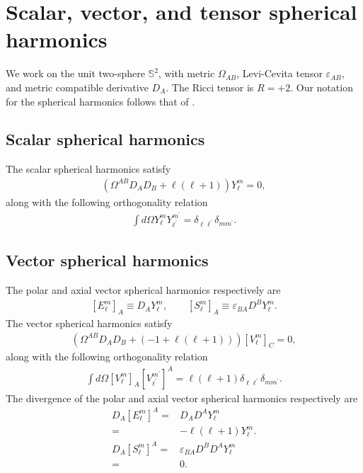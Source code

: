 \documentclass[12pt]{report}
\begin{document}
\appendix
\chapter{Scalar, vector, and tensor spherical harmonics
\label{sec:scalar_vector_tensor_spherical_harmonics}}
We work on the unit two-sphere $\mathbb{S}^2$, with metric $\Omega_{AB}$,
Levi-Cevita tensor $\varepsilon_{AB}$, 
and metric compatible derivative $D_A$. 
The Ricci tensor is $R=+2$.
Our notation for the spherical harmonics follows that of
\cite{Nagar:2005ea}.

\section{Scalar spherical harmonics}
The scalar spherical harmonics satisfy
\begin{align}
    \left(
        \Omega^{AB}D_AD_B
        +
        \ell\left(\ell+1\right)
    \right)
    Y^m_{\ell}
    =
    0
    ,
\end{align}
along with the following orthogonality relation
\begin{align}
    \int d\Omega Y^m_{\ell}Y^{m^{\prime}}_{\ell^{\prime}}
    =
    \delta_{\ell\ell^{\prime}}\delta_{mm^{\prime}}
    .
\end{align}
\section{Vector spherical harmonics}
The polar and axial
vector spherical harmonics respectively are
\begin{align}
    \left[E^m_{\ell}\right]_A
    \equiv
    D_AY^m_{\ell}
    ,\qquad
    \left[S^m_{\ell}\right]_A
    \equiv
    \varepsilon_{BA}D^BY^m_{\ell}
    .
\end{align}
The vector spherical harmonics satisfy
\begin{align}
    \left(
        \Omega^{AB}D_AD_B
        +
        \left(-1+\ell\left(\ell+1\right)\right)
    \right)
    \left[V^m_{\ell}\right]_C
    =
    0
    ,
\end{align}
along with the following orthogonality relation
\begin{align}
    \int d\Omega 
        \left[V^m_{\ell}\right]_A
        \left[V^{m^{\prime}}_{\ell^{\prime}}\right]^A
    =
    \ell\left(\ell+1\right)
    \delta_{\ell\ell^{\prime}}\delta_{mm^{\prime}}
    .
\end{align}
The divergence of the polar and axial vector spherical harmonics
respectively are
\begin{align}
    D_A\left[E^m_{\ell}\right]^A
    =&
    D_AD^AY^m_{\ell}
    \nonumber\\
    =&
    -
    \ell\left(\ell+1\right)Y^m_{\ell}
    .\\
    D_A\left[S^m_{\ell}\right]^A
    =&
    \varepsilon_{BA}D^BD^AY^m_{\ell}
    \nonumber\\
    =&
    0
    .
\end{align}
\end{document}
